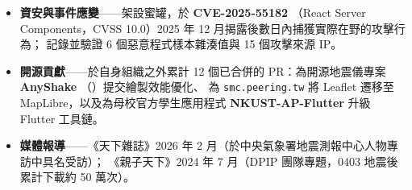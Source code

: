 \documentclass[zh]{resume}
\begin{document}
\begin{itemize}
  \item \textbf{資安與事件應變}——架設蜜罐，於 \textbf{CVE-2025-55182}
    （React Server Components，CVSS 10.0）2025 年 12 月揭露後數日內捕獲實際在野的攻擊行為；
    記錄並驗證 6 個惡意程式樣本雜湊值與 15 個攻擊來源 IP。
  \item \textbf{開源貢獻}——於自身組織之外累計 12 個已合併的 PR：為開源地震儀專案 \textbf{AnyShake}
    （）提交繪製效能優化、
    為 \texttt{smc.peering.tw} 將 Leaflet 遷移至 MapLibre，以及為母校官方學生應用程式
    \textbf{NKUST-AP-Flutter} 升級 Flutter 工具鏈。
  \item \textbf{媒體報導}——《天下雜誌》2026 年 2 月（於中央氣象署地震測報中心人物專訪中具名受訪）；
    《親子天下》2024 年 7 月（DPIP 團隊專題，0403 地震後累計下載約 50 萬次）。
\end{itemize}
\end{document}
